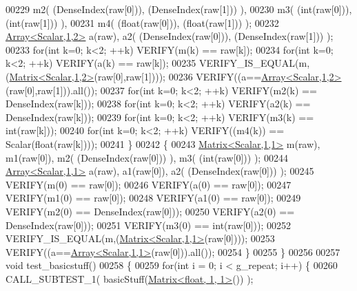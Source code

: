 \begin{DoxyCode}
00229                        m2( (DenseIndex(raw[0])), (DenseIndex(raw[1])) ),
00230                        m3( (\textcolor{keywordtype}{int}(raw[0])), (\textcolor{keywordtype}{int}(raw[1])) ),
00231                        m4( (\textcolor{keywordtype}{float}(raw[0])), (\textcolor{keywordtype}{float}(raw[1])) );
00232     \hyperlink{group___core___module_class_eigen_1_1_array}{Array<Scalar,1,2>} a(raw),  a2( (DenseIndex(raw[0])), (DenseIndex(raw[1])) );
00233     \textcolor{keywordflow}{for}(\textcolor{keywordtype}{int} k=0; k<2; ++k) VERIFY(m(k) == raw[k]);
00234     \textcolor{keywordflow}{for}(\textcolor{keywordtype}{int} k=0; k<2; ++k) VERIFY(a(k) == raw[k]);
00235     VERIFY\_IS\_EQUAL(m,(\hyperlink{group___core___module_class_eigen_1_1_matrix}{Matrix<Scalar,1,2>}(raw[0],raw[1])));
00236     VERIFY((a==\hyperlink{group___core___module_class_eigen_1_1_array}{Array<Scalar,1,2>}(raw[0],raw[1])).all());
00237     \textcolor{keywordflow}{for}(\textcolor{keywordtype}{int} k=0; k<2; ++k) VERIFY(m2(k) == DenseIndex(raw[k]));
00238     \textcolor{keywordflow}{for}(\textcolor{keywordtype}{int} k=0; k<2; ++k) VERIFY(a2(k) == DenseIndex(raw[k]));
00239     \textcolor{keywordflow}{for}(\textcolor{keywordtype}{int} k=0; k<2; ++k) VERIFY(m3(k) == \textcolor{keywordtype}{int}(raw[k]));
00240     \textcolor{keywordflow}{for}(\textcolor{keywordtype}{int} k=0; k<2; ++k) VERIFY((m4(k)) == Scalar(\textcolor{keywordtype}{float}(raw[k])));
00241   \}
00242   \{
00243     \hyperlink{group___core___module_class_eigen_1_1_matrix}{Matrix<Scalar,1,1>} m(raw), m1(raw[0]), m2( (DenseIndex(raw[0])) ), m3( (\textcolor{keywordtype}{int}(raw[0])) 
      );
00244     \hyperlink{group___core___module_class_eigen_1_1_array}{Array<Scalar,1,1>} a(raw), a1(raw[0]), a2( (DenseIndex(raw[0])) );
00245     VERIFY(m(0) == raw[0]);
00246     VERIFY(a(0) == raw[0]);
00247     VERIFY(m1(0) == raw[0]);
00248     VERIFY(a1(0) == raw[0]);
00249     VERIFY(m2(0) == DenseIndex(raw[0]));
00250     VERIFY(a2(0) == DenseIndex(raw[0]));
00251     VERIFY(m3(0) == \textcolor{keywordtype}{int}(raw[0]));
00252     VERIFY\_IS\_EQUAL(m,(\hyperlink{group___core___module_class_eigen_1_1_matrix}{Matrix<Scalar,1,1>}(raw[0])));
00253     VERIFY((a==\hyperlink{group___core___module_class_eigen_1_1_array}{Array<Scalar,1,1>}(raw[0])).all());
00254   \}
00255 \}
00256 
00257 \textcolor{keywordtype}{void} test\_basicstuff()
00258 \{
00259   \textcolor{keywordflow}{for}(\textcolor{keywordtype}{int} i = 0; i < g\_repeat; i++) \{
00260     CALL\_SUBTEST\_1( basicStuff(\hyperlink{group___core___module_class_eigen_1_1_matrix}{Matrix<float, 1, 1>}()) );

\end{DoxyCode}
